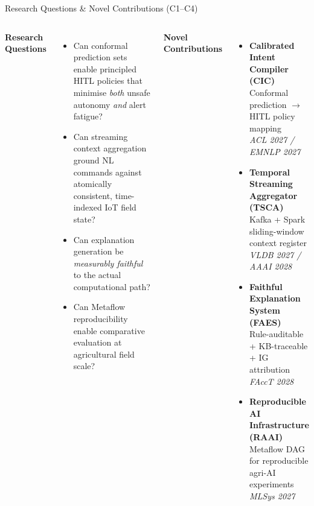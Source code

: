 \documentclass[aspectratio=169,10pt]{beamer}
\begin{document}
\begin{frame}{Research Questions \& Novel Contributions (C1--C4)}

\begin{columns}[T]
\textbf{\color{techblue}Research Questions}
\begin{itemize}\small
  \item[\textbf{RQ1}] Can conformal prediction sets enable principled HITL policies
    that minimise \emph{both} unsafe autonomy \emph{and} alert fatigue?
  \item[\textbf{RQ2}] Can streaming context aggregation ground NL commands against
    atomically consistent, time-indexed IoT field state?
  \item[\textbf{RQ3}] Can explanation generation be \emph{measurably faithful} to
    the actual computational path?
  \item[\textbf{RQ4}] Can Metaflow reproducibility enable comparative evaluation at
    agricultural field scale?
\end{itemize}

\textbf{\color{techblue}Novel Contributions}
\begin{itemize}\small
  \item[\textbf{C1}] \textbf{Calibrated Intent Compiler (CIC)} \\
    Conformal prediction $\to$ HITL policy mapping \\
    \textit{\color{agrigreen}ACL 2027 / EMNLP 2027}
  \item[\textbf{C2}] \textbf{Temporal Streaming Aggregator (TSCA)} \\
    Kafka + Spark sliding-window context register \\
    \textit{\color{agrigreen}VLDB 2027 / AAAI 2028}
  \item[\textbf{C3}] \textbf{Faithful Explanation System (FAES)} \\
    Rule-auditable + KB-traceable + IG attribution \\
    \textit{\color{agrigreen}FAccT 2028}
  \item[\textbf{C4}] \textbf{Reproducible AI Infrastructure (RAAI)} \\
    Metaflow DAG for reproducible agri-AI experiments \\
    \textit{\color{agrigreen}MLSys 2027}
\end{itemize}
\end{columns}

\end{frame}
\end{document}
